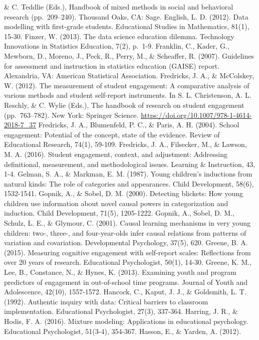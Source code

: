 \documentclass[]{book}
\theoremstyle{definition}
\theoremstyle{definition}
\theoremstyle{definition}
\theoremstyle{remark}
\begin{document}
\& C. Teddlie (Eds.), Handbook of mixed methods in social and behavioral
research (pp.~209--240). Thousand Oaks, CA: Sage. English, L. D. (2012).
Data modelling with first-grade students. Educational Studies in
Mathematics, 81(1), 15-30. Finzer, W. (2013). The data science education
dilemma. Technology Innovations in Statistics Education, 7(2), p.~1-9.
Franklin, C., Kader, G., Mewborn, D., Moreno, J., Peck, R., Perry, M.,
\& Scheaffer, R. (2007). Guidelines for assessment and instruction in
statistics education (GAISE) report. Alexandria, VA: American
Statistical Association. Fredricks, J. A., \& McColskey, W. (2012). The
measurement of student engagement: A comparative analysis of various
methods and student self-report instruments. In S. L. Christenson, A. L.
Reschly, \& C. Wylie (Eds.), The handbook of research on student
engagement (pp.~763--782). New York: Springer Science.
\url{https://doi.org/10.1007/978-1-4614-2018-7_37} Fredricks, J. A.,
Blumenfeld, P. C., \& Paris, A. H. (2004). School engagement: Potential
of the concept, state of the evidence. Review of Educational Research,
74(1), 59-109. Fredricks, J. A., Filsecker, M., \& Lawson, M. A. (2016).
Student engagement, context, and adjustment: Addressing definitional,
measurement, and methodological issues. Learning \& Instruction, 43,
1-4. Gelman, S. A., \& Markman, E. M. (1987). Young children's
inductions from natural kinds: The role of categories and appearances.
Child Development, 58(6), 1532-1541. Gopnik, A., \& Sobel, D. M. (2000).
Detecting blickets: How young children use information about novel
causal powers in categorization and induction. Child Development, 71(5),
1205-1222. Gopnik, A., Sobel, D. M., Schulz, L. E., \& Glymour, C.
(2001). Causal learning mechanisms in very young children: two-, three-,
and four-year-olds infer causal relations from patterns of variation and
covariation. Developmental Psychology, 37(5), 620. Greene, B. A. (2015).
Measuring cognitive engagement with self-report scales: Reflections from
over 20 years of research. Educational Psychologist, 50(1), 14-30.
Greene, K. M., Lee, B., Constance, N., \& Hynes, K. (2013). Examining
youth and program predictors of engagement in out-of-school time
programs. Journal of Youth and Adolescence, 42(10), 1557-1572. Hancock,
C., Kaput, J. J., \& Goldsmith, L. T. (1992). Authentic inquiry with
data: Critical barriers to classroom implementation. Educational
Psychologist, 27(3), 337-364. Harring, J. R., \& Hodis, F. A. (2016).
Mixture modeling: Applications in educational psychology. Educational
Psychologist, 51(3-4), 354-367. Hasson, E., \& Yarden, A. (2012).
\end{document}
